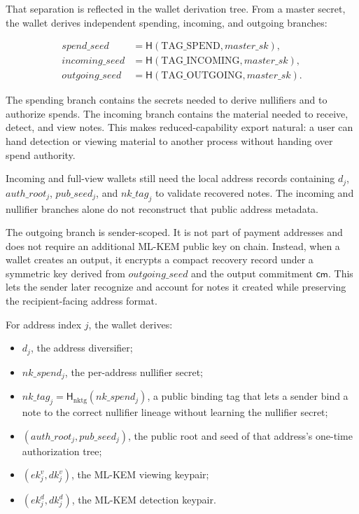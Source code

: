 \documentclass[11pt]{article}
\newcommand{\Hash}{\mathsf{H}}
\newcommand{\cm}{\mathsf{cm}}
\begin{document}
That separation is reflected in the wallet derivation tree. From a master
secret, the wallet derives independent spending, incoming, and outgoing
branches:

\[
\begin{aligned}
spend\_seed &= \Hash(\mathrm{TAG\_SPEND}, master\_sk), \\
incoming\_seed &= \Hash(\mathrm{TAG\_INCOMING}, master\_sk), \\
outgoing\_seed &= \Hash(\mathrm{TAG\_OUTGOING}, master\_sk).
\end{aligned}
\]

The spending branch contains the secrets needed to derive nullifiers and to
authorize spends. The incoming branch contains the material needed to receive,
detect, and view notes. This makes reduced-capability export natural: a user
can hand detection or viewing material to another process without handing over
spend authority.

Incoming and full-view wallets still need the local address records containing
\(d_j\), \(auth\_root_j\), \(pub\_seed_j\), and \(nk\_tag_j\) to validate
recovered notes.
The incoming and nullifier branches alone do not reconstruct that public address
metadata.

The outgoing branch is sender-scoped. It is not part of payment addresses and
does not require an additional ML-KEM public key on chain. Instead, when a wallet
creates an output, it encrypts a compact recovery record under a symmetric key
derived from \(outgoing\_seed\) and the output commitment \(\cm\). This lets the
sender later recognize and account for notes it created while preserving the
recipient-facing address format.

For address index \(j\), the wallet derives:

\begin{itemize}
  \item \(d_j\), the address diversifier;
  \item \(nk\_spend_j\), the per-address nullifier secret;
  \item \(nk\_tag_j = \Hash_{\mathrm{nktg}}(nk\_spend_j)\), a public binding tag
        that lets a sender bind a note to the correct nullifier lineage without
        learning the nullifier secret;
  \item \((auth\_root_j, pub\_seed_j)\), the public root and seed of that
        address's one-time authorization tree;
  \item \((ek^v_j, dk^v_j)\), the ML-KEM viewing keypair;
  \item \((ek^d_j, dk^d_j)\), the ML-KEM detection keypair.
\end{itemize}
\end{document}
